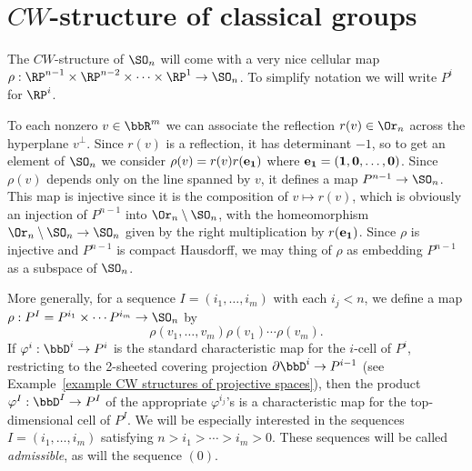 \section{\texorpdfstring{$CW$}{CW}-structure of classical groups}\label{sec: CW structure of SO(n)}

The $CW$-structure of $\SO_n$ will come with a very nice cellular map $\rho:\RP^{n-1}\times \RP^{n-2}\times\cdots\times\RP^1\to \SO_n$. To simplify notation we will write $P^i$ for $\RP^i$.

To each nonzero $v\in\bbR^m$ we can associate the reflection $r(v)\in\Or_n$ across the hyperplane $v^\perp$. Since $r(v)$ is a reflection, it has determinant $-1$, so to get an element of $\SO_n$ we consider $\rho(v)=r(v)r(\bf{e}_1)$ where $\bf{e}_1=(1,0,\ldots,0)$. Since $\rho(v)$ depends only on the line spanned by $v$, it defines a map $P^{n-1}\to \SO_n$. This map is injective since it is the composition of $v\mapsto r(v)$, which is obviously an injection of $P^{n-1}$ into $\Or_n\setminus \SO_n$, with the homeomorphism $\Or_n\setminus \SO_n\to \SO_n$ given by the right multiplication by $r(\bf{e}_1)$. Since $\rho $ is injective and $P^{n-1}$ is compact Hausdorff, we may thing of $\rho$ as embedding $P^{n-1}$ as a subspace of $\SO_n$. 

More generally, for a sequence $I=(i_1,\ldots,i_m)$ with each $i_j<n$, we define a map $\rho:P^I=P^{i_1}\times\cdots P^{i_m}\to \SO_n$ by \[\rho(v_1,\ldots,v_m)\rho(v_1)\cdots \rho(v_m).\]
If $\varphi^i:\bbD^i\to P^i$ is the standard characteristic map for the $i$-cell of $P^i$, restricting to the 2-sheeted covering projection $\partial \bbD^i\to P^{i-1}$ (see Example~\ref{example CW structures of projective spaces}), then the product $\varphi^I:\bbD^I\to P^I$ of the appropriate $\varphi^{i_j}$'s is a characteristic map for the top-dimensional cell of $P^I$. We will be especially interested in the sequences $I=(i_1,\ldots,i_m)$ satisfying $n>i_1>\cdots >i_m>0$. These sequences will be called \emph{admissible}, as will the sequence $(0)$.

